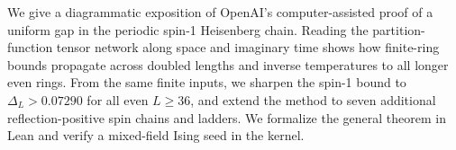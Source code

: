 We give a diagrammatic exposition of OpenAI's computer-assisted
proof of a uniform gap in the periodic spin-1 Heisenberg chain.
Reading the partition-function tensor network along space and
imaginary time shows how finite-ring bounds propagate across doubled
lengths and inverse temperatures to all longer even rings. From the
same finite inputs, we sharpen the spin-1 bound to $\Delta_L>0.07290$
for all even $L\ge36$, and extend the method to seven additional
reflection-positive spin chains and ladders. We formalize the general
theorem in Lean and verify a mixed-field Ising seed in the kernel.
